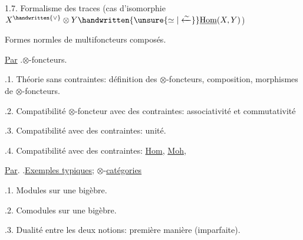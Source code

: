 1.7.  \handwritten{(}Formalisme des traces (cas  d'isomorphie $X^{\handwritten{\vee}}\otimes Y\handwritten{\unsure{\simeq|\xleftarrow{\sim}}}\underline{\mathrm{Hom}}(X,Y)$)

  Formes normles de multifoncteurs composés. 

\uline{Par} .\qquad $\otimes$-foncteurs.

.1. Théorie sans contraintes: définition des $\otimes$-foncteurs, composition, morphismes de $\otimes$-foncteurs.

.2. Compatibilité  $\otimes$-foncteur avec des contraintes: associativité et commutativité\handwritten{!}

.3. Compatibilité avec des contraintes: unité.

.4. Compatibilité avec des contraintes: \uline{Hom}, \uline{Moh}, 


\uline{Par}. .\qquad \uline{Exemples typiques;} $\otimes$-\uline{catégories}


.1. Modules sur une bigèbre.

.2. Comodules sur une bigèbre.

.3. Dualité entre les deux notions: première manière (imparfaite).

